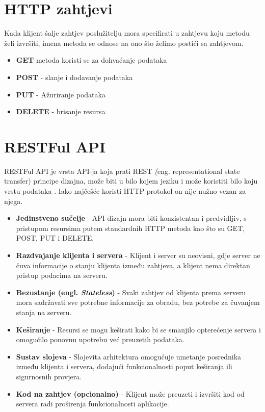 \documentclass{foi}
\begin{document}
\section{HTTP zahtjevi}
Kada klijent šalje zahtjev poslužitelju mora specifirati u zahtjevu koju metodu želi izvršiti, imena metoda se odnose na ono što želimo postići sa zahtjevom. \cite{Maurya2021} 
\begin{itemize}
    \item \textbf{GET} metoda koristi se za dohvaćanje podataka
    \item \textbf{POST} - slanje i dodavanje podataka
    \item \textbf{PUT} - Ažuriranje podataka
    \item \textbf{DELETE} - brisanje resursa 
\end{itemize}

\section{RESTFul API}
RESTFul API je vrsta API-ja koja prati REST \textit(eng. {representational state transfer}) principe dizajna, može biti u bilo kojem jeziku i može koristiti bilo koju vrstu podataka \cite{ibm_rest_api}.
Iako najčešće koristi HTTP protokol on nije nužno vezan za njega.\cite{Microsoft2023}
\begin{itemize}
    \item \textbf{Jedinstveno sučelje} - API dizajn mora biti konzistentan i predvidljiv, s pristupom resursima putem standardnih HTTP metoda kao što su GET, POST, PUT i DELETE.
    
    \item \textbf{Razdvajanje klijenta i servera} - Klijent i server su neovisni, gdje server ne čuva informacije o stanju klijenta između zahtjeva, a klijent nema direktan pristup podacima na serveru.
    
    \item \textbf{Bezustanje (engl. \textit{Stateless})} - Svaki zahtjev od klijenta prema serveru mora sadržavati sve potrebne informacije za obradu, bez potrebe za čuvanjem stanja na serveru.
    
    \item \textbf{Keširanje} - Resursi se mogu keširati kako bi se smanjilo opterećenje servera i omogućilo ponovnu upotrebu već preuzetih podataka.
    
    \item \textbf{Sustav slojeva} - Slojevita arhitektura omogućuje umetanje posrednika između klijenta i servera, dodajući funkcionalnosti poput keširanja ili sigurnosnih provjera.
    
    \item \textbf{Kod na zahtjev (opcionalno)} - Klijent može preuzeti i izvršiti kod od servera radi proširenja funkcionalnosti aplikacije. 
\end{itemize}
\end{document}
